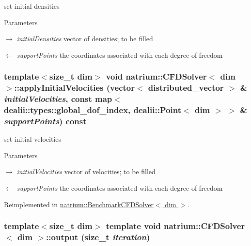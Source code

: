 set initial densities 
\begin{DoxyParams}{Parameters}
\item[\mbox{$\rightarrow$} {\em initialDensities}]vector of densities; to be filled \item[\mbox{$\leftarrow$} {\em supportPoints}]the coordinates associated with each degree of freedom \end{DoxyParams}
\hypertarget{classnatrium_1_1CFDSolver_afd82bfa5e1e613ef99b9b870cb73db0e}{
\subsubsection[{applyInitialVelocities}]{\setlength{\rightskip}{0pt plus 5cm}template$<$size\_\-t dim$>$ void {\bf natrium::CFDSolver}$<$ dim $>$::applyInitialVelocities (vector$<$ distributed\_\-vector $>$ \& {\em initialVelocities}, \/  const map$<$ dealii::types::global\_\-dof\_\-index, dealii::Point$<$ dim $>$ $>$ \& {\em supportPoints}) const}}
\label{classnatrium_1_1CFDSolver_afd82bfa5e1e613ef99b9b870cb73db0e}


set initial velocities 
\begin{DoxyParams}{Parameters}
\item[\mbox{$\rightarrow$} {\em initialVelocities}]vector of velocities; to be filled \item[\mbox{$\leftarrow$} {\em supportPoints}]the coordinates associated with each degree of freedom \end{DoxyParams}


Reimplemented in \hyperlink{classnatrium_1_1BenchmarkCFDSolver_a7883dcfd4469ae65ae62cad09ae5d160}{natrium::BenchmarkCFDSolver$<$ dim $>$}.\hypertarget{classnatrium_1_1CFDSolver_abf6804f132885502b61877fc1f9ca4a2}{
\subsubsection[{output}]{\setlength{\rightskip}{0pt plus 5cm}template$<$size\_\-t dim$>$ template void {\bf natrium::CFDSolver}$<$ dim $>$::output (size\_\-t {\em iteration})}}
\label{classnatrium_1_1CFDSolver_abf6804f132885502b61877fc1f9ca4a2}


